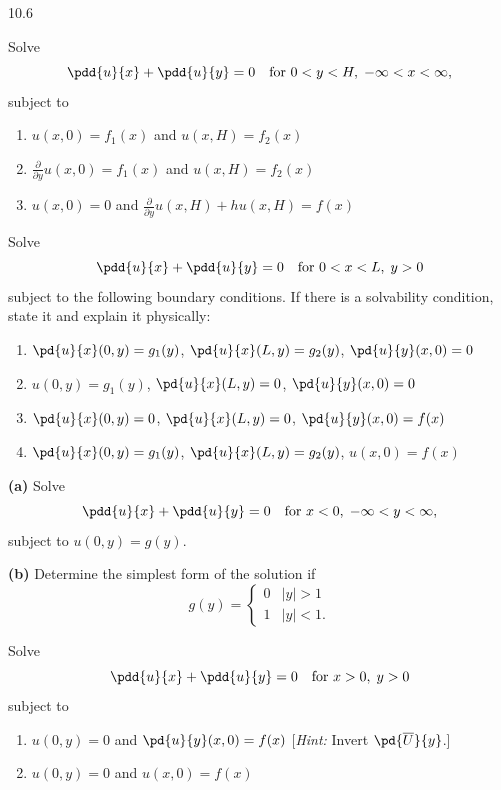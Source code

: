 \begin{exercises}{10.6}
\item Solve
\[
\pdd{u}{x}+\pdd{u}{y}=0 \quad \text{for } 0 < y < H,\;-\infty < x < \infty,
\]
subject to
\begin{enumerate}
\item[\starred (a)] $u(x,0) = f_1(x)$ and $u(x,H) = f_2(x)$
\item[(b)] $\frac{\partial}{\partial y}u(x,0) = f_1(x)$ and $u(x,H) = f_2(x)$
\item[(c)] $u(x,0) = 0$ and $\frac{\partial}{\partial y}u(x,H)+hu(x,H) = f(x)$
\end{enumerate}

\item Solve
\[
\pdd{u}{x}+\pdd{u}{y}=0 \quad \text{for } 0 < x < L,\;y > 0
\]
subject to the following boundary conditions.  If there is a solvability condition, state it and explain it physically:
\begin{enumerate}
\item[(a)] $\pd{u}{x}(0,y) = g_1(y)$, \quad $\pd{u}{x}(L,y) = g_2(y)$, \quad $\pd{u}{y}(x,0) = 0$
\item[\starred (b)] $u(0,y) = g_1(y)$, \quad $\pd{u}{x}(L,y) = 0$, \quad $\pd{u}{y}(x,0) = 0$
\item[(c)] $\pd{u}{x}(0,y) = 0$, \quad $\pd{u}{x}(L,y) = 0$, \quad $\pd{u}{y}(x,0) = f(x)$
\item[(d)] $\pd{u}{x}(0,y) = g_1(y)$, \quad $\pd{u}{x}(L,y) = g_2(y)$, \quad $u(x,0) = f(x)$
\end{enumerate}

\item \textbf{(a)} Solve
\[
\pdd{u}{x}+\pdd{u}{y}=0 \quad \text{for } x < 0,\;-\infty < y < \infty,
\]
subject to $u(0,y) = g(y)$.

\textbf{(b)} Determine the simplest form of the solution if
\[
g(y) = \begin{cases} 0 & |y| > 1 \\ 1 & |y| < 1. \end{cases}
\]

\item Solve
\[
\pdd{u}{x}+\pdd{u}{y}=0 \quad \text{for } x > 0,\;y > 0
\]
subject to
\begin{enumerate}
\item[\starred (a)] $u(0,y) = 0$ and $\pd{u}{y}(x,0) = f(x)$ [\textit{Hint:} Invert $\pd{\overline{U}}{y}$.]
\item[(b)] $u(0,y) = 0$ and $u(x,0) = f(x)$
\end{enumerate}


\end{exercises}
